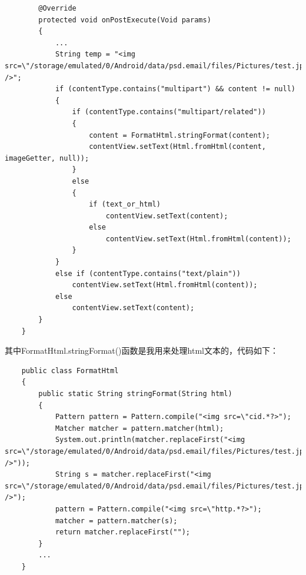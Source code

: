 \documentclass[a4paper,left=2.5cm,right=2.5cm,11pt]{article}
\begin{document}
\begin{lstlisting}
        @Override
        protected void onPostExecute(Void params)
        {
            ...
            String temp = "<img src=\"/storage/emulated/0/Android/data/psd.email/files/Pictures/test.jpg\" />";
            if (contentType.contains("multipart") && content != null)
            {
                if (contentType.contains("multipart/related"))
                {
                    content = FormatHtml.stringFormat(content);
                    contentView.setText(Html.fromHtml(content, imageGetter, null));
                }
                else
                {
                    if (text_or_html)
                        contentView.setText(content);
                    else
                        contentView.setText(Html.fromHtml(content));
                }
            }
            else if (contentType.contains("text/plain"))
                contentView.setText(Html.fromHtml(content));
            else
                contentView.setText(content);
        }
    }
	\end{lstlisting}

	其中FormatHtml.stringFormat()函数是我用来处理html文本的，代码如下：
	\begin{lstlisting}
	public class FormatHtml
	{
		public static String stringFormat(String html)
		{
			Pattern pattern = Pattern.compile("<img src=\"cid.*?>");
			Matcher matcher = pattern.matcher(html);
			System.out.println(matcher.replaceFirst("<img src=\"/storage/emulated/0/Android/data/psd.email/files/Pictures/test.jpg\" />"));
			String s = matcher.replaceFirst("<img src=\"/storage/emulated/0/Android/data/psd.email/files/Pictures/test.jpg\" />");
			pattern = Pattern.compile("<img src=\"http.*?>");
			matcher = pattern.matcher(s);
			return matcher.replaceFirst("");
		}
		...
	}
	\end{lstlisting}
\end{document}
